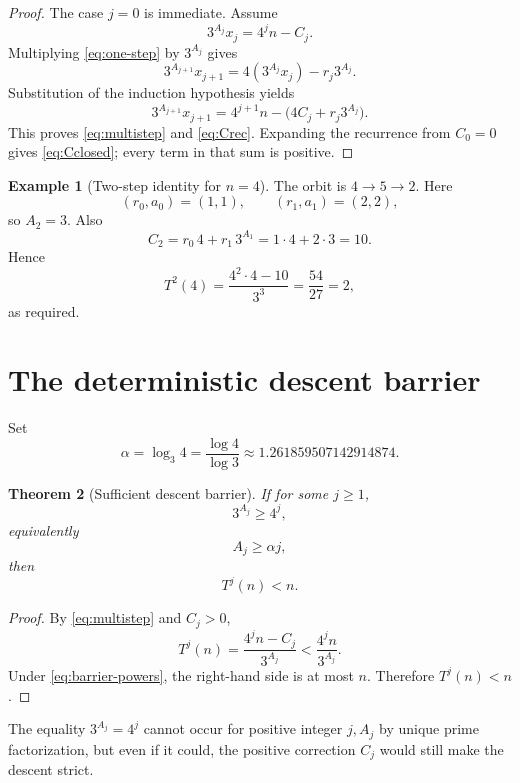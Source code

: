 \documentclass[11pt]{article}
\newtheorem{theorem}{Theorem}[section]
\theoremstyle{definition}
\newtheorem{example}[theorem]{Example}
\theoremstyle{remark}
\begin{document}
\begin{proof}
The case $j=0$ is immediate.  Assume
\[
3^{A_j}x_j=4^jn-C_j.
\]
Multiplying \eqref{eq:one-step} by $3^{A_j}$ gives
\[
3^{A_{j+1}}x_{j+1}
=
4(3^{A_j}x_j)-r_j3^{A_j}.
\]
Substitution of the induction hypothesis yields
\[
3^{A_{j+1}}x_{j+1}
=
4^{j+1}n-\bigl(4C_j+r_j3^{A_j}\bigr).
\]
This proves \eqref{eq:multistep} and \eqref{eq:Crec}.  Expanding the recurrence from $C_0=0$ gives \eqref{eq:Cclosed}; every term in that sum is positive.
\end{proof}

\begin{example}[Two-step identity for $n=4$]
The orbit is $4\to5\to2$.  Here
\[
(r_0,a_0)=(1,1),\qquad (r_1,a_1)=(2,2),
\]
so $A_2=3$.  Also
\[
C_2=r_0\,4+r_1\,3^{A_1}=1\cdot4+2\cdot3=10.
\]
Hence
\[
T^2(4)=\frac{4^2\cdot4-10}{3^3}
=\frac{54}{27}=2,
\]
as required.
\end{example}

\section{The deterministic descent barrier}

Set
\begin{equation}
\alpha=\log_3 4
=\frac{\log4}{\log3}
\approx1.261859507142914874.
\label{eq:alpha}
\end{equation}

\begin{theorem}[Sufficient descent barrier]
If for some $j\ge1$,
\begin{equation}
3^{A_j}\ge4^j,
\label{eq:barrier-powers}
\end{equation}
equivalently
\begin{equation}
A_j\ge\alpha j,
\label{eq:barrier}
\end{equation}
then
\begin{equation}
\boxed{T^j(n)<n.}
\label{eq:descent}
\end{equation}
\end{theorem}

\begin{proof}
By \eqref{eq:multistep} and $C_j>0$,
\[
T^j(n)
=
\frac{4^jn-C_j}{3^{A_j}}
<
\frac{4^jn}{3^{A_j}}.
\]
Under \eqref{eq:barrier-powers}, the right-hand side is at most $n$.
Therefore $T^j(n)<n$.
\end{proof}

The equality $3^{A_j}=4^j$ cannot occur for positive integer $j,A_j$ by unique prime factorization, but even if it could, the positive correction $C_j$ would still make the descent strict.
\end{document}
